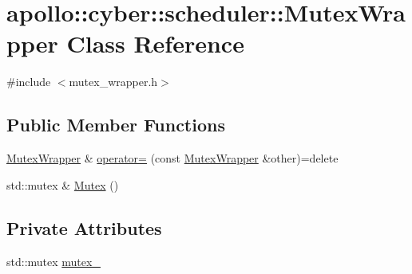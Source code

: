 \hypertarget{classapollo_1_1cyber_1_1scheduler_1_1MutexWrapper}{\section{apollo\-:\-:cyber\-:\-:scheduler\-:\-:Mutex\-Wrapper Class Reference}
\label{classapollo_1_1cyber_1_1scheduler_1_1MutexWrapper}
}


{\ttfamily \#include $<$mutex\-\_\-wrapper.\-h$>$}

\subsection*{Public Member Functions}
\begin{DoxyCompactItemize}
\item 
\hyperlink{classapollo_1_1cyber_1_1scheduler_1_1MutexWrapper}{Mutex\-Wrapper} \& \hyperlink{classapollo_1_1cyber_1_1scheduler_1_1MutexWrapper_ac4ff34bfcdb1e7fbb5ee1dde2edbcd96}{operator=} (const \hyperlink{classapollo_1_1cyber_1_1scheduler_1_1MutexWrapper}{Mutex\-Wrapper} \&other)=delete
\item 
std\-::mutex \& \hyperlink{classapollo_1_1cyber_1_1scheduler_1_1MutexWrapper_a1991ff8beac244b3c5298a2a1031a4f0}{Mutex} ()
\end{DoxyCompactItemize}
\subsection*{Private Attributes}
\begin{DoxyCompactItemize}
\item 
std\-::mutex \hyperlink{classapollo_1_1cyber_1_1scheduler_1_1MutexWrapper_a99fcc976748625f57e25fffc097ce8c5}{mutex\-\_\-}
\end{DoxyCompactItemize}


